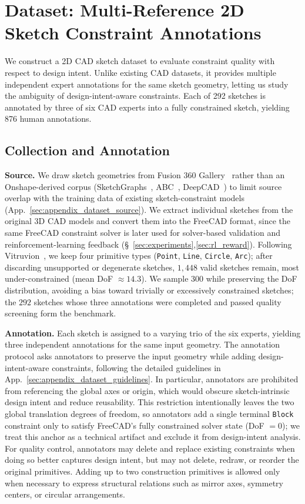 \section{Dataset: Multi-Reference 2D Sketch Constraint Annotations}
\label{sec:dataset}

We construct a 2D CAD sketch dataset to evaluate constraint quality with respect to design intent.
Unlike existing CAD datasets, it provides multiple independent expert annotations for the same sketch geometry, letting us study the ambiguity of design-intent-aware constraints.
Each of 292 sketches is annotated by three of six CAD experts into a fully constrained sketch, yielding 876 human annotations.

\subsection{Collection and Annotation}

\textbf{Source.}
We draw sketch geometries from Fusion 360 Gallery~\cite{willis2020fusion} rather than an Onshape-derived corpus (SketchGraphs~\cite{seff2020sketchgraphs}, ABC~\cite{Koch_2019_CVPR}, DeepCAD~\cite{Wu_2021_ICCV}) to limit source overlap with the training data of existing sketch-constraint models (App.~\ref{sec:appendix_dataset_source}).
We extract individual sketches from the original 3D CAD models and convert them into the FreeCAD format, since the same FreeCAD constraint solver is later used for solver-based validation and reinforcement-learning feedback (\S~\ref{sec:experiments},\ref{sec:rl_reward}).
Following Vitruvion~\cite{seff2021vitruvion}, we keep four primitive types (\texttt{Point}, \texttt{Line}, \texttt{Circle}, \texttt{Arc}); after discarding unsupported or degenerate sketches, $1{,}448$ valid sketches remain, most under-constrained (mean DoF $\approx 14.3$).
We sample $300$ while preserving the DoF distribution, avoiding a bias toward trivially or excessively constrained sketches; the $292$ sketches whose three annotations were completed and passed quality screening form the benchmark.

\textbf{Annotation.}
Each sketch is assigned to a varying trio of the six experts, yielding three independent annotations for the same input geometry.
The annotation protocol asks annotators to preserve the input geometry while adding design-intent-aware constraints, following the detailed guidelines in App.~\ref{sec:appendix_dataset_guidelines}.
In particular, annotators are prohibited from referencing the global axes or origin, which would obscure sketch-intrinsic design intent and reduce reusability.
This restriction intentionally leaves the two global translation degrees of freedom, so annotators add a single terminal \texttt{Block} constraint only to satisfy FreeCAD's fully constrained solver state (DoF $=0$); we treat this anchor as a technical artifact and exclude it from design-intent analysis.
For quality control, annotators may delete and replace existing constraints when doing so better captures design intent, but may not delete, redraw, or reorder the original primitives.
Adding up to two construction primitives is allowed only when necessary to express structural relations such as mirror axes, symmetry centers, or circular arrangements.

